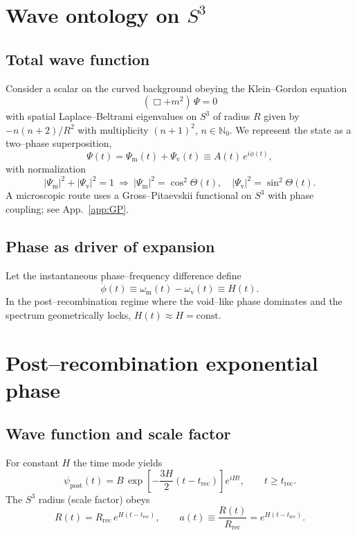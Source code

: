 \documentclass[aps,prd,twocolumn,superscriptaddress,preprintnumbers,amsmath,amssymb,floatfix]{revtex4-2}
\newcommand{\Sthree}{S^{3}}
\newcommand{\Rec}{t_{\mathrm{rec}}}
\begin{document}
\section{Wave ontology on $\Sthree$}\label{sec:wave}

\subsection{Total wave function}
Consider a scalar on the curved background obeying the Klein--Gordon equation
\begin{equation}
(\Box + m^2)\,\Psi = 0
\label{eq:KG}
\end{equation}
with spatial Laplace--Beltrami eigenvalues on $\Sthree$ of radius $R$ given by $-n(n+2)/R^2$ with multiplicity $(n+1)^2$, $n\in\mathbb{N}_0$. We represent the state as a two--phase superposition,
\begin{equation}
\Psi(t) = \Psi_{\mathrm{m}}(t)+\Psi_{\mathrm{v}}(t) \equiv A(t)\,e^{i\phi(t)},
\end{equation}
with normalization
\begin{equation}
|\Psi_{\mathrm{m}}|^2+|\Psi_{\mathrm{v}}|^2 = 1
\ \Rightarrow\
|\Psi_{\mathrm{m}}|^2=\cos^2\Theta(t),\quad
|\Psi_{\mathrm{v}}|^2=\sin^2\Theta(t).
\end{equation}
A microscopic route uses a Gross--Pitaevskii functional on $\Sthree$ with phase coupling; see App.~\ref{app:GP}.

\subsection{Phase as driver of expansion}
Let the instantaneous phase--frequency difference define
\begin{equation}
\dot{\phi}(t) \equiv \omega_{\mathrm{m}}(t)-\omega_{\mathrm{v}}(t) \equiv H(t).
\label{eq:Hdef}
\end{equation}
In the post--recombination regime where the void--like phase dominates and the spectrum geometrically locks, $H(t)\approx H=\text{const}$.

\section{Post--recombination exponential phase}\label{sec:post}

\subsection{Wave function and scale factor}
For constant $H$ the time mode yields
\begin{equation}
\psi_{\mathrm{post}}(t) = B\,\exp\!\left[-\frac{3H}{2}(t-\Rec)\right] e^{iHt},\qquad t\ge \Rec .
\label{eq:psi_post}
\end{equation}
The $\Sthree$ radius (scale factor) obeys
\begin{equation}
R(t) = R_{\mathrm{rec}}\,e^{H(t-\Rec)},\qquad
a(t)\equiv \frac{R(t)}{R_{\mathrm{rec}}}=e^{H(t-\Rec)}.
\label{eq:Rexp}
\end{equation}
\end{document}
